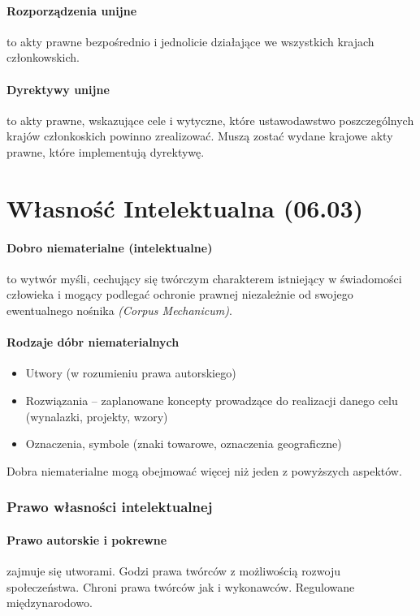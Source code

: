 \message{ !name(owi.tex)}\documentclass{article}
\begin{document}
\paragraph[]{Rozporządzenia unijne} to akty prawne
bezpośrednio i jednolicie działające we wszystkich krajach członkowskich.

\paragraph{Dyrektywy unijne} to akty prawne,
wskazujące cele i wytyczne, które ustawodawstwo poszczególnych krajów członkoskich powinno zrealizować.
Muszą zostać wydane krajowe akty prawne, które implementują dyrektywę.

\section{Własność Intelektualna (06.03)}

\paragraph{Dobro niematerialne (intelektualne)}
to wytwór myśli, cechujący się twórczym charakterem istniejący w świadomości człowieka
i mogący podlegać ochronie prawnej niezależnie od swojego ewentualnego nośnika \textit{(Corpus Mechanicum)}.

\paragraph{Rodzaje dóbr niematerialnych}
\begin{itemize}
  \item Utwory (w rozumieniu prawa autorskiego)
  \item Rozwiązania -- zaplanowane koncepty prowadzące do realizacji danego celu (wynalazki, projekty, wzory)
  \item Oznaczenia, symbole (znaki towarowe, oznaczenia geograficzne)
\end{itemize}
Dobra niematerialne mogą obejmować więcej niż jeden z powyższych aspektów.

\subsubsection{Prawo własności intelektualnej}

\paragraph{Prawo autorskie i pokrewne}
zajmuje się utworami. Godzi prawa twórców z możliwością rozwoju społeczeństwa. Chroni prawa twórców jak i wykonawców. Regulowane międzynarodowo.
\end{document}
